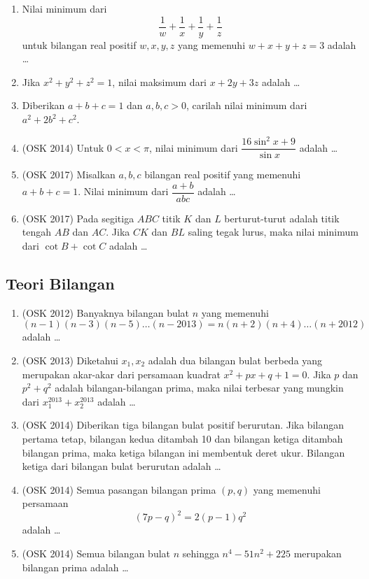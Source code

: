\begin{enumerate}
        \item Nilai minimum dari $$\dfrac{1}{w}+\dfrac{1}{x}+\dfrac{1}{y}+\dfrac{1}{z}$$
        untuk bilangan real positif $w,x,y,z$ yang memenuhi $w+x+y+z=3$ adalah \dots
        
        \item Jika $x^2+y^2+z^2=1$, nilai maksimum dari $x+2y+3z$ adalah \dots
        
        \item Diberikan $a+b+c=1$ dan $a,b,c>0$, carilah nilai minimum dari $a^2+2b^2+c^2$.
        
        \item (OSK 2014) Untuk $0 < x < \pi$, nilai minimum dari $\dfrac{16 \sin^2 x + 9}{\sin x}$ adalah \dots
        
        \item (OSK 2017) Misalkan $a,b,c$ bilangan real positif yang memenuhi $a+b+c=1$. Nilai minimum dari $\dfrac{a+b}{abc}$ adalah \dots
        
        \item (OSK 2017) Pada segitiga $ABC$ titik $K$ dan $L$ berturut-turut adalah titik tengah $AB$ dan $AC$. Jika $CK$ dan $BL$ saling tegak lurus, maka nilai minimum dari $\cot B + \cot C$ adalah \dots
    \end{enumerate}
    \subsection{Teori Bilangan}
        \begin{enumerate}
            \item (OSK 2012) Banyaknya bilangan bulat $n$ yang memenuhi $$(n-1)(n-3)(n-5)\dots(n-2013)=n(n+2)(n+4)\dots (n+2012)$$ adalah \dots
            
            \item (OSK 2013) Diketahui $x_1,x_2$ adalah dua bilangan bulat berbeda yang merupakan akar-akar dari persamaan kuadrat $x^2+px+q+1=0$. Jika $p$ dan $p^2+q^2$ adalah bilangan-bilangan prima, maka nilai terbesar yang mungkin dari $x_1^{2013}+x_2^{2013}$ adalah \dots
            
            \item (OSK 2014) Diberikan tiga bilangan bulat positif berurutan. Jika bilangan pertama tetap, bilangan kedua ditambah 10 dan bilangan ketiga ditambah bilangan prima, maka ketiga bilangan ini membentuk deret ukur. Bilangan ketiga dari bilangan bulat berurutan adalah \dots
            
            \item (OSK 2014) Semua pasangan bilangan prima $(p,q)$ yang memenuhi persamaan
            $$(7p-q)^2=2(p-1)q^2$$
            adalah \dots
            
            \item (OSK 2014) Semua bilangan bulat $n$ sehingga $n^4-51n^2+225$ merupakan bilangan prima adalah \dots
        \end{enumerate}
        
